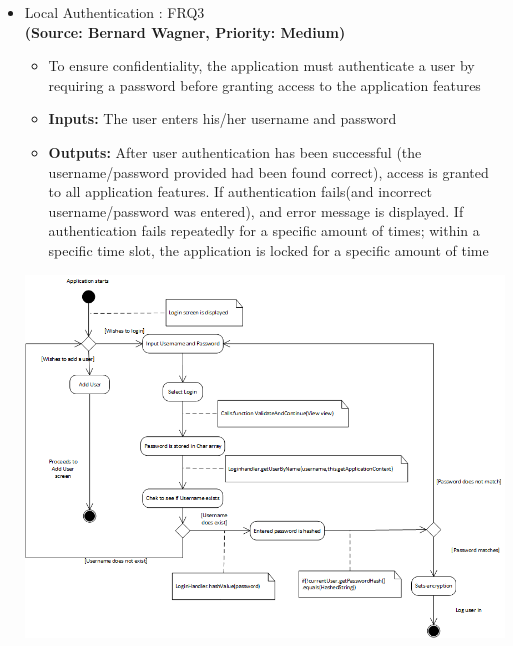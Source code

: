 \begin{itemize}
\item{Local Authentication : FRQ3}\\%
\textbf{(Source: Bernard Wagner, Priority: Medium)}
\begin{itemize}
\item To ensure confidentiality, the application must authenticate a user by requiring a password before granting access to the application features
\item \textbf{Inputs:} The user enters his/her username and password
\item \textbf{Outputs:} After user authentication has been successful (the username/password provided had been found correct), access is granted to all application features. If authentication fails(and incorrect username/password was entered), and error message is displayed. If authentication fails repeatedly for a specific amount of times; within a specific time slot, the application is locked for a specific amount of time
\end{itemize}
 \includegraphics[width=13cm]{diagrams/StateDiagrams/LocalAuthenticationStateDiagram.png}
\end{itemize}
